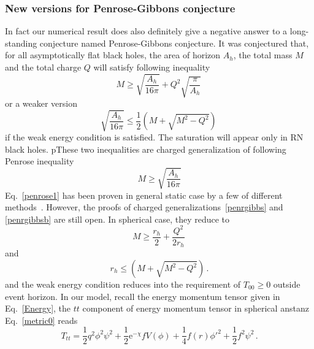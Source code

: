 \documentclass[pr, twocolumn, preprintnumbers, showpacs,footnoteadded, superscriptaddress,nofootinbib,longbibliography]{revtex4-1}
\newcommand{\te}{\mathrm{e}}
\begin{document}
\subsubsection{New versions for Penrose-Gibbons conjecture}
In fact our numerical result does also definitely give a negative answer to a long-standing conjecture named Penrose-Gibbons conjecture. It was conjectured that, for all asymptotically flat black holes, the area of horizon $A_h$, the total mass $M$ and the total charge $Q$ will satisfy following inequality~\cite{Mars:2009cj}
%
\begin{equation}\label{penrgibbs}
  M\geq\sqrt{\frac{A_h}{16\pi}}+Q^2\sqrt{\frac{\pi}{A_h}}\,
\end{equation}
%
or a weaker version
%
\begin{equation}\label{penrgibbsb}
  \sqrt{\frac{A_h}{16\pi}}\leq\frac12\left(M+\sqrt{M^2-Q^2}\right)\,
\end{equation}
%
if the weak energy condition is satisfied. The saturation will appear only in RN black holes. pThese two inequalities are charged generalization of following Penrose inequality
%
\begin{equation}\label{penrose1}
  M\geq\sqrt{\frac{A_h}{16\pi}}
\end{equation}
%
Eq.~\eqref{penrose1} has been proven in general static case by a few of different methods~\cite{Mars:2009cj}. However, the proofs of charged generalizations~\eqref{penrgibbs} and \eqref{penrgibbsb} are still open. In spherical case, they reduce to
%
\begin{equation}\label{penrgibbs2}
  M\geq\frac{r_h}2+\frac{Q^2}{2r_h}\,
\end{equation}
%
and
%
\begin{equation}\label{penrgibbs3}
  r_h\leq\left(M+\sqrt{M^2-Q^2}\right)\,.
\end{equation}
%
and the weak energy condition reduces into the requirement of $T_{00}\geq0$ outside event horizon.  In our model, recall the energy momentum tensor given in Eq.~\eqref{Energy}, the $tt$ component of energy momentum tensor in spherical anstanz Eq.~\eqref{metric0} reads
%
\begin{equation}
T_{tt}=\frac{1}{2}q^2\phi^2\psi^2+\frac{1}{2}\te^{-\chi}f V(\phi)+\frac{1}{4}f(r)\phi'^2+\frac{1}{2}f^2\psi^2 \, .
\end{equation}
%
\end{document}
